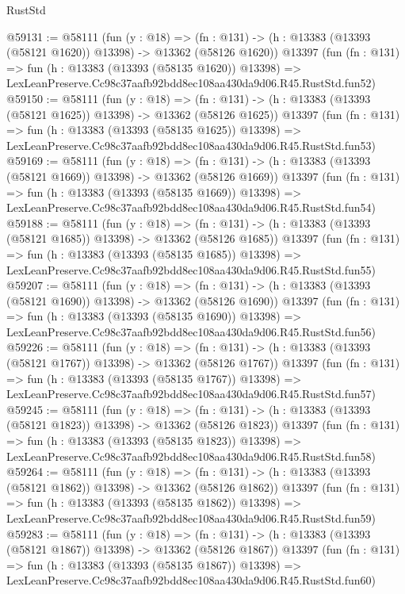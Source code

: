 \begin{lexlean}{RustStd}
\begin{coremodule}
@59131 := @58111
    (fun (y : @18) =>
    (fn : @131) -> (h : @13383 (@13393 (@58121 @1620)) @13398) -> @13362 (@58126 @1620))
    @13397
    (fun (fn : @131) =>
    fun (h : @13383 (@13393 (@58135 @1620)) @13398) =>
    LexLeanPreserve.Cc98c37aafb92bdd8ec108aa430da9d06.R45.RustStd.fun52)
@59150 := @58111
    (fun (y : @18) =>
    (fn : @131) -> (h : @13383 (@13393 (@58121 @1625)) @13398) -> @13362 (@58126 @1625))
    @13397
    (fun (fn : @131) =>
    fun (h : @13383 (@13393 (@58135 @1625)) @13398) =>
    LexLeanPreserve.Cc98c37aafb92bdd8ec108aa430da9d06.R45.RustStd.fun53)
@59169 := @58111
    (fun (y : @18) =>
    (fn : @131) -> (h : @13383 (@13393 (@58121 @1669)) @13398) -> @13362 (@58126 @1669))
    @13397
    (fun (fn : @131) =>
    fun (h : @13383 (@13393 (@58135 @1669)) @13398) =>
    LexLeanPreserve.Cc98c37aafb92bdd8ec108aa430da9d06.R45.RustStd.fun54)
@59188 := @58111
    (fun (y : @18) =>
    (fn : @131) -> (h : @13383 (@13393 (@58121 @1685)) @13398) -> @13362 (@58126 @1685))
    @13397
    (fun (fn : @131) =>
    fun (h : @13383 (@13393 (@58135 @1685)) @13398) =>
    LexLeanPreserve.Cc98c37aafb92bdd8ec108aa430da9d06.R45.RustStd.fun55)
@59207 := @58111
    (fun (y : @18) =>
    (fn : @131) -> (h : @13383 (@13393 (@58121 @1690)) @13398) -> @13362 (@58126 @1690))
    @13397
    (fun (fn : @131) =>
    fun (h : @13383 (@13393 (@58135 @1690)) @13398) =>
    LexLeanPreserve.Cc98c37aafb92bdd8ec108aa430da9d06.R45.RustStd.fun56)
@59226 := @58111
    (fun (y : @18) =>
    (fn : @131) -> (h : @13383 (@13393 (@58121 @1767)) @13398) -> @13362 (@58126 @1767))
    @13397
    (fun (fn : @131) =>
    fun (h : @13383 (@13393 (@58135 @1767)) @13398) =>
    LexLeanPreserve.Cc98c37aafb92bdd8ec108aa430da9d06.R45.RustStd.fun57)
@59245 := @58111
    (fun (y : @18) =>
    (fn : @131) -> (h : @13383 (@13393 (@58121 @1823)) @13398) -> @13362 (@58126 @1823))
    @13397
    (fun (fn : @131) =>
    fun (h : @13383 (@13393 (@58135 @1823)) @13398) =>
    LexLeanPreserve.Cc98c37aafb92bdd8ec108aa430da9d06.R45.RustStd.fun58)
@59264 := @58111
    (fun (y : @18) =>
    (fn : @131) -> (h : @13383 (@13393 (@58121 @1862)) @13398) -> @13362 (@58126 @1862))
    @13397
    (fun (fn : @131) =>
    fun (h : @13383 (@13393 (@58135 @1862)) @13398) =>
    LexLeanPreserve.Cc98c37aafb92bdd8ec108aa430da9d06.R45.RustStd.fun59)
@59283 := @58111
    (fun (y : @18) =>
    (fn : @131) -> (h : @13383 (@13393 (@58121 @1867)) @13398) -> @13362 (@58126 @1867))
    @13397
    (fun (fn : @131) =>
    fun (h : @13383 (@13393 (@58135 @1867)) @13398) =>
    LexLeanPreserve.Cc98c37aafb92bdd8ec108aa430da9d06.R45.RustStd.fun60)

\end{coremodule}
\end{lexlean}
